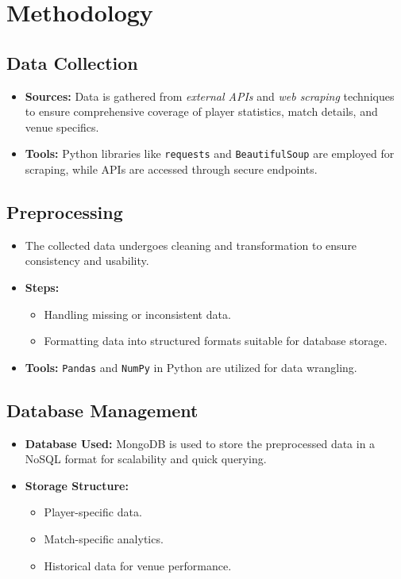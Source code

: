\section{Methodology}

\subsection{Data Collection}
\begin{itemize}
    \item \textbf{Sources:} Data is gathered from \textit{external APIs} and \textit{web scraping} techniques to ensure comprehensive coverage of player statistics, match details, and venue specifics.
    \item \textbf{Tools:} Python libraries like \texttt{requests} and \texttt{BeautifulSoup} are employed for scraping, while APIs are accessed through secure endpoints.
\end{itemize}

\subsection{Preprocessing}
\begin{itemize}
    \item The collected data undergoes cleaning and transformation to ensure consistency and usability.
    \item \textbf{Steps:}
    \begin{itemize}
        \item Handling missing or inconsistent data.
        \item Formatting data into structured formats suitable for database storage.
    \end{itemize}
    \item \textbf{Tools:} \texttt{Pandas} and \texttt{NumPy} in Python are utilized for data wrangling.
\end{itemize}

\subsection{Database Management}
\begin{itemize}
    \item \textbf{Database Used:} MongoDB is used to store the preprocessed data in a NoSQL format for scalability and quick querying.
    \item \textbf{Storage Structure:}
    \begin{itemize}
        \item Player-specific data.
        \item Match-specific analytics.
        \item Historical data for venue performance.
    \end{itemize}
\end{itemize}

